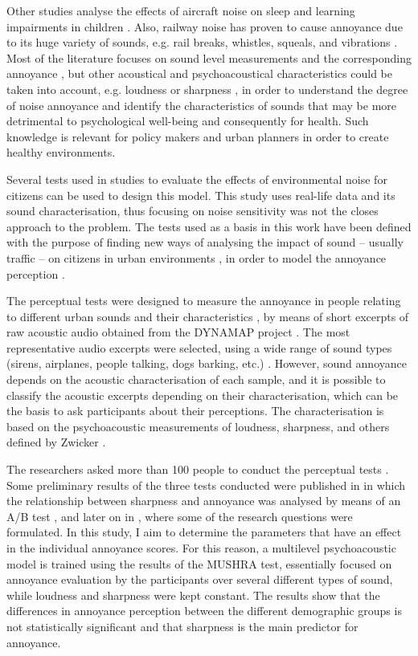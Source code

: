  Other studies analyse the effects of aircraft noise on sleep \cit{} and learning impairments in children \cit{}. Also, railway noise has proven to cause annoyance due to its huge variety of sounds, e.g. rail breaks, whistles, squeals, and vibrations . Most of the literature focuses on sound level measurements and the corresponding annoyance , but other acoustical and psychoacoustical characteristics could be taken into account, e.g. loudness or sharpness , in order to understand the degree of noise annoyance and identify the characteristics of sounds that may be more detrimental to psychological well-being and consequently for health. Such knowledge is relevant for policy makers and urban planners in order to create healthy environments.

 Several tests used in studies to evaluate the effects of environmental noise for citizens  can be used to design this model. This study uses real-life data and its sound characterisation, thus focusing on noise sensitivity was not the closes approach to the problem. The tests used as a basis in this work have been defined with the purpose of finding new ways of analysing the impact of sound -- usually traffic -- on citizens in urban environments , in order to model the annoyance perception .

 The perceptual tests were designed to measure the annoyance in people relating to different urban sounds and their characteristics , by means of short excerpts of raw acoustic audio obtained from the DYNAMAP project . The most representative audio excerpts were selected, using a wide range of sound types (sirens, airplanes, people talking, dogs barking, etc.) . However, sound annoyance depends on the acoustic characterisation of each sample, and it is possible to classify the acoustic excerpts depending on their characterisation, which can be the basis to ask participants about their perceptions. The characterisation is based on the psychoacoustic measurements of loudness, sharpness, and others defined by Zwicker .

 The researchers asked more than 100 people to conduct the perceptual tests . Some preliminary results of the three tests conducted were published in  in which the relationship between sharpness and annoyance was analysed by means of an A/B test , and later on in , where some of the research questions were formulated. In this study, I aim to determine the parameters that have an effect in the individual annoyance scores. For this reason, a multilevel psychoacoustic model is trained using the results of the MUSHRA  test, essentially focused on annoyance evaluation by the participants over several different types of sound, while loudness and sharpness were kept constant. The results show that the differences in annoyance perception between the different demographic groups is not statistically significant and that sharpness is the main predictor for annoyance.

